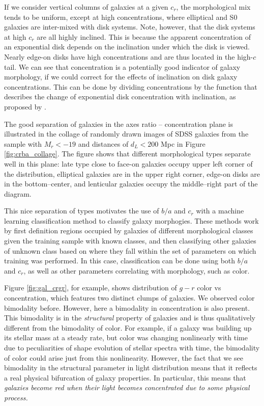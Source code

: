 If we consider vertical columns of galaxies at a given $c_r$, the morphological mix tends to be uniform, except at high concentrations, where elliptical and S0 galaxies are inter-mixed with disk systems. Note, however, that the disk systems at high $c_r$ are all highly inclined. 
This is because the apparent concentration of an exponential disk depends on the inclination under which the disk is viewed. Nearly edge-on disks have high concentrations and are thus located in the high-$c$ tail. 
We can see that concentration is a potentially good indicator of galaxy morphology, if we could correct for the effects of inclination on disk galaxy concentrations. This can be done by dividing concentrations by the function that describes the change of exponential disk concentration with inclination, as proposed by \href{http://adsabs.harvard.edu/abs/2008ApJ...681..225B}{\citet{bailin_harris08b}}. 

The good separation of galaxies in the axes ratio -- concentration plane is illustrated in the collage of randomly drawn images of SDSS galaxies from the sample with $M_r<-19$ and distances of $d_L<200$ Mpc in Figure \ref{fig:crba_collage}. The figure shows that different morphological types separate well in this plane: late type close to face-on galaxies occupy upper left corner of the distribution, elliptical galaxies are in the upper right corner, edge-on disks are in the bottom--center, and lenticular galaxies occupy the middle--right part of the diagram. 

This nice separation of types motivates the use of $b/a$ and $c_r$ with a machine learning classification method to classify galaxy morphogies. These methods work by first definition regions occupied by galaxies of different morphological classes given the training sample with known classes, and then classifying other galaxies of unknown class based on where they fall within the set of parameters on which training was performed. In this case, classification can be done using both $b/a$ and $c_r$, as well as other parameters correlating with morphology, such as color.

Figure \ref{fig:gal_crgr}, for example, shows distribution of $g-r$ color vs concentration, which features two distinct clumps of galaxies. We observed color bimodality before. However, here a bimodality in concentration is also present. This bimodality is in the {\it structural} property of galaxies and is thus qualitatively different from the bimodality of color.
For example, if a galaxy was building up its stellar mass at a steady rate, but color was changing nonlinearly with time due to peculiarities of shape evolution of stellar spectra with time, the bimodality of color could arise just from this nonlinearity. However, the fact that we see bimodality in the structural parameter in light distribution means that it reflects a real physical bifurcation of galaxy properties. In particular, this means that {\it galaxies become red when their light becomes concentrated due to some physical process.} 


